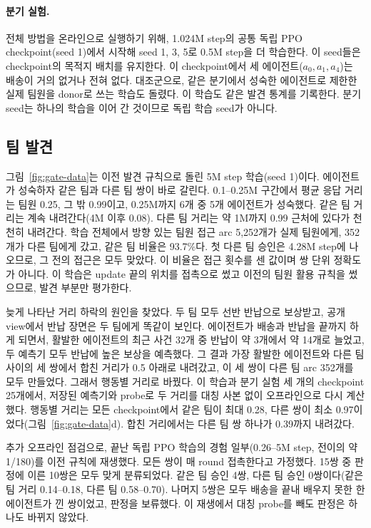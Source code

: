 \documentclass[10pt,twocolumn,letterpaper]{article}
\begin{document}
\paragraph{분기 실험.} 전체 방법을 온라인으로 실행하기 위해, 1.024M step의 공통 독립 PPO checkpoint(seed 1)에서 시작해 seed 1, 3, 5로 0.5M step을 더 학습한다. 이 seed들은 checkpoint의 목적지 배치를 유지한다. 이 checkpoint에서 세 에이전트($a_0,a_1,a_4$)는 배송이 거의 없거나 전혀 없다. 대조군으로, 같은 분기에서 성숙한 에이전트로 제한한 실제 팀원을 donor로 쓰는 학습도 돌렸다. 이 학습도 같은 발견 통계를 기록한다. 분기 seed는 하나의 학습을 이어 간 것이므로 독립 학습 seed가 아니다.

\subsection{팀 발견}\label{sec:discovery}
그림~\ref{fig:gate-data}는 이전 발견 규칙으로 돌린 5M step 학습(seed 1)이다. 에이전트가 성숙하자 같은 팀과 다른 팀 쌍이 바로 갈린다. 0.1--0.25M 구간에서 평균 응답 거리는 팀원 0.25, 그 밖 0.99이고, 0.25M까지 6개 중 5개 에이전트가 성숙했다. 같은 팀 거리는 계속 내려간다(4M 이후 0.08). 다른 팀 거리는 약 1M까지 0.99 근처에 있다가 천천히 내려간다. 학습 전체에서 방향 있는 팀원 접근 arc 5{,}252개가 실제 팀원에게, 352개가 다른 팀에게 갔고, 같은 팀 비율은 93.7\%다. 첫 다른 팀 승인은 4.28M step에 나오므로, 그 전의 접근은 모두 맞았다. 이 비율은 접근 횟수를 센 값이며 쌍 단위 정확도가 아니다. 이 학습은 update 끝의 위치를 접촉으로 썼고 이전의 팀원 활용 규칙을 썼으므로, 발견 부분만 평가한다.

늦게 나타난 거리 하락의 원인을 찾았다. 두 팀 모두 선반 반납으로 보상받고, 공개 view에서 반납 장면은 두 팀에게 똑같이 보인다. 에이전트가 배송과 반납을 끝까지 하게 되면서, 활발한 에이전트의 최근 사건 32개 중 반납이 약 3개에서 약 14개로 늘었고, 두 예측기 모두 반납에 높은 보상을 예측했다. 그 결과 가장 활발한 에이전트와 다른 팀 사이의 세 쌍에서 합친 거리가 0.5 아래로 내려갔고, 이 세 쌍이 다른 팀 arc 352개를 모두 만들었다. 그래서 행동별 거리로 바꿨다. 이 학습과 분기 실험 세 개의 checkpoint 25개에서, 저장된 예측기와 probe로 두 거리를 대칭 사본 없이 오프라인으로 다시 계산했다. 행동별 거리는 모든 checkpoint에서 같은 팀이 최대 0.28, 다른 쌍이 최소 0.97이었다(그림~\ref{fig:gate-data}d). 합친 거리에서는 다른 팀 쌍 하나가 0.39까지 내려갔다.

추가 오프라인 점검으로, 끝난 독립 PPO 학습의 경험 일부(0.26--5M step, 전이의 약 1/180)를 이전 규칙에 재생했다. 모든 쌍이 매 round 접촉한다고 가정했다. 15쌍 중 판정에 이른 10쌍은 모두 맞게 분류되었다. 같은 팀 승인 4쌍, 다른 팀 승인 0쌍이다(같은 팀 거리 0.14--0.18, 다른 팀 0.58--0.70). 나머지 5쌍은 모두 배송을 끝내 배우지 못한 한 에이전트가 낀 쌍이었고, 판정을 보류했다. 이 재생에서 대칭 probe를 빼도 판정은 하나도 바뀌지 않았다.
\end{document}
